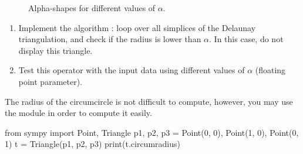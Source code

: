 \begin{figure}[htbp]
\hspace{.5cm}
\caption{Alpha-shapes for different values of $\alpha$.}
\label{fig:alphashapes:alphashapes}
\end{figure}

\begin{qbox}
\begin{enumerate}
\item Implement the algorithm : loop over all simplices of the Delaunay triangulation, and check if the radius is lower than $\alpha$. In this case, do not display this triangle.
\item Test this operator with the input data using different values of $\alpha$ (floating point parameter).
\end{enumerate}
\end{qbox}

\begin{pcomment}
The radius of the circumcircle is not difficult to compute, however, you may use the module  in order to compute it easily.

 \begin{python}
from sympy import Point, Triangle
p1, p2, p3 = Point(0, 0), Point(1, 0), Point(0, 1)
t = Triangle(p1, p2, p3)
print(t.circumradius)
 \end{python}

\end{pcomment}

